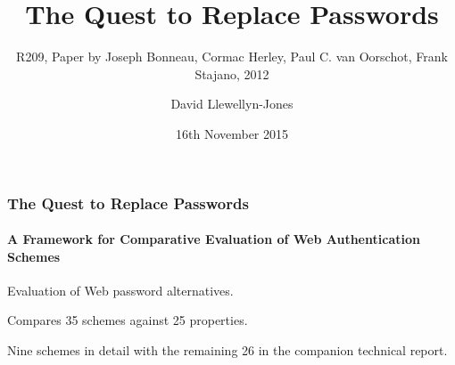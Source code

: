 \documentclass[handout, notes=hide]{beamer}
\begin{document}
\title{The Quest to Replace Passwords}
\subtitle{R209, Paper by Joseph Bonneau, Cormac Herley, Paul C. van Oorschot, Frank Stajano, 2012}
\author{David Llewellyn-Jones}
\date{16th November 2015}


\frame{\titlepage}


\begin{frame}
\frametitle{The Quest to Replace Passwords}
\framesubtitle{A Framework for Comparative Evaluation of Web Authentication Schemes}
\setlength{\parskip}{0.5em}

Evaluation of Web password alternatives.

Compares 35 schemes against 25 properties.

Nine schemes in detail with the remaining 26 in the companion technical report.

\end{frame}
\note{
}

\end{document}
